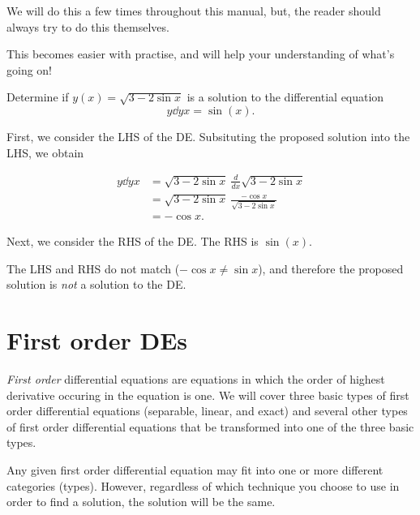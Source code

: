 \documentclass{book}
\begin{document}
We will do this a few times throughout this manual, but, the reader
should always try to do this themselves.

This becomes easier with practise, and will help your understanding of
what's going on!

\begin{example*}
  Determine if $y(x) = \sqrt{3-2\sin x}$ is a solution to the
  differential equation
  \begin{dmath*}
    y \dd{y}{x} = \sin(x).
  \end{dmath*}
\end{example*}

\begin{solution}
  First, we consider the LHS of the DE.  Subsituting the proposed
  solution into the LHS, we obtain

  \begin{align*}
    y \dd{y}{x} & = \sqrt{3-2\sin x}\ \frac{d}{dx} \sqrt{3-2\sin x} \\
                & = \sqrt{3-2\sin x}\ \frac{-\cos x}{\sqrt{3-2\sin x}} \\
                & = - \cos x.
  \end{align*}

  Next, we consider the RHS of the DE.  The RHS is $\sin(x)$.

  The LHS and RHS do not match ($-\cos x \neq \sin x$), and therefore
  the proposed solution is \emph{not} a solution to the DE.
\end{solution}


\newpage
\chapter{First order DEs}

\emph{First order} differential equations are equations in which the
order of highest derivative occuring in the equation is one.  We will
cover three basic types of first order differential equations
(separable, linear, and exact) and several other types of first order
differential equations that be transformed into one of the three basic
types.

\begin{heads}
  Any given first order differential equation may fit into one or more
  different categories (types).  However, regardless of which
  technique you choose to use in order to find a solution, the
  solution will be the same.
\end{heads}
\end{document}
